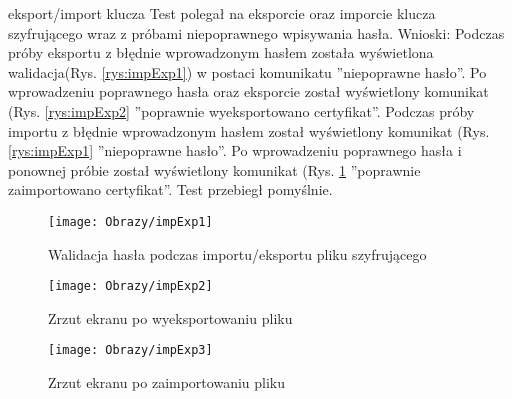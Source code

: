 \begin{enumerate*}
		\newpage
	\item eksport/import klucza
	Test polegał na eksporcie oraz imporcie klucza szyfrującego wraz z próbami niepoprawnego wpisywania hasła.
	Wnioski: Podczas próby eksportu z błędnie wprowadzonym hasłem została wyświetlona walidacja(Rys. \ref{rys:impExp1}) w postaci komunikatu ''niepoprawne hasło''. Po wprowadzeniu poprawnego hasła oraz eksporcie został wyświetlony komunikat (Rys. \ref{rys:impExp2} ''poprawnie wyeksportowano certyfikat''. Podczas próby importu z błędnie wprowadzonym hasłem został wyświetlony komunikat (Rys. \ref{rys:impExp1} ''niepoprawne hasło''. Po wprowadzeniu poprawnego hasła i ponownej próbie został wyświetlony komunikat (Rys. \ref{rys:impExp3} ''poprawnie zaimportowano certyfikat''. Test przebiegł pomyślnie.
	
	\begin{figure}[ht!]
		\centering
		\begin{minipage}{0.3\textwidth}
			\vspace{0.3cm}
			\texttt{[image: Obrazy/impExp1]}
			\caption{Walidacja hasła podczas importu/eksportu pliku szyfrującego}
			\label{rys:impExp1}
		\end{minipage}
	\hspace{0.01\textwidth}
		\begin{minipage}{0.3\textwidth}
			\texttt{[image: Obrazy/impExp2]}
			\caption{Zrzut ekranu po wyeksportowaniu pliku }
			\label{rys:impExp2}
		\end{minipage}
		\hspace{0.01\textwidth}
		\begin{minipage}{0.3\textwidth}
			\texttt{[image: Obrazy/impExp3]}
			\caption{Zrzut ekranu po zaimportowaniu pliku }
			\label{rys:impExp3}
		\end{minipage}
	\end{figure}
\end{enumerate*}
